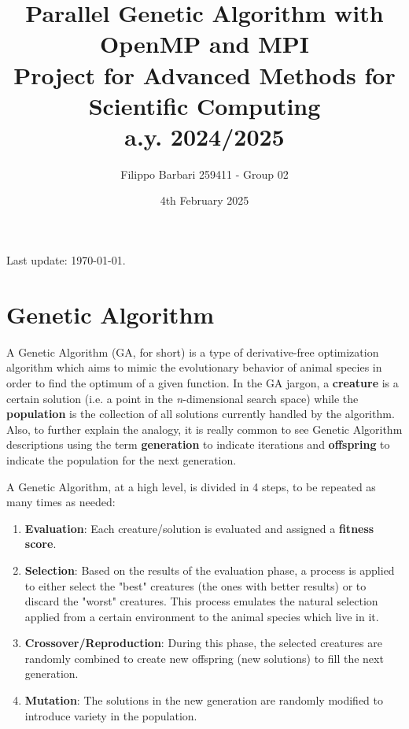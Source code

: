 \documentclass[12pt,a4paper,oneside]{article}
\title{%
	Parallel Genetic Algorithm with OpenMP and MPI \\
	\large Project for Advanced Methods for Scientific Computing \\
	a.y. 2024/2025}
\author{Filippo Barbari 259411 - Group 02}
\date{4th February 2025}
\begin{document}
	\maketitle
	
	\vfill
	\begin{center}
		\scriptsize
		Last update: \today.
	\end{center}
	\clearpage
	
	\tableofcontents
	\clearpage
	
	\section{Genetic Algorithm}
	A Genetic Algorithm (GA, for short) is a type of derivative-free optimization algorithm which aims to mimic the evolutionary behavior of animal species in order to find the optimum of a given function.
	In the GA jargon, a \textbf{creature} is a certain solution (i.e. a point in the \textit{n}-dimensional search space) while the \textbf{population} is the collection of all solutions currently handled by the algorithm. Also, to further explain the analogy, it is really common to see Genetic Algorithm descriptions using the term \textbf{generation} to indicate iterations and \textbf{offspring} to indicate the population for the next generation.
	
	A Genetic Algorithm, at a high level, is divided in 4 steps, to be repeated as many times as needed:
	\begin{enumerate}
		\item \textbf{Evaluation}: Each creature/solution is evaluated and assigned a \textbf{fitness score}.

		\item \textbf{Selection}: Based on the results of the evaluation phase, a process is applied to either select the "best" creatures (the ones with better results) or to discard the "worst" creatures. This process emulates the natural selection applied from a certain environment to the animal species which live in it.
		
		\item \textbf{Crossover/Reproduction}: During this phase, the selected creatures are randomly combined to create new offspring (new solutions) to fill the next generation.

		\item \textbf{Mutation}: The solutions in the new generation are randomly modified to introduce variety in the population.
	\end{enumerate}
\end{document}
